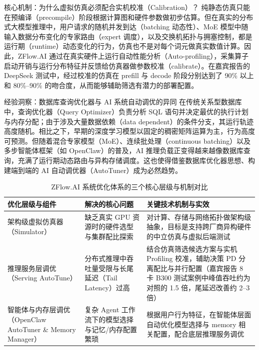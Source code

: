 \documentclass[UTF8,a4paper,11pt,fontset=fandol]{ctexart}
\begin{document}
\begin{importantbox}{核心机制：为什么虚拟仿真必须配合实机校准（Calibration）？}
纯静态仿真只能在预编译（precompile）阶段根据计算图和硬件参数做初步估算。但在真实的分布式大模型推理中，用户请求的随机并发到达（batching 动态性）、MoE 模型中随输入数据分布变化的专家路由（expert 调度），以及交换机拓扑与拥塞控制，都是运行期（runtime）动态变化的行为，仿真也不是对每个词元做真实数值计算。因此，ZFlow.AI 通过在真实硬件上运行自动性能分析（Auto-profiling），采集算子启动开销与运行分布特征并反馈给仿真器做参数校准（calibrate）。在嘉宾报告的 DeepSeek 测试中，经过校准的仿真在 prefill 与 decode 阶段分别达到了 90\% 以上和 80\%–90\% 的吻合度，从而能够辅助筛选有潜力的部署配置。
\end{importantbox}
\begin{knowledgebox}{经验洞察：数据库查询优化器与 AI 系统自动调优的异同}
在传统关系型数据库中，查询优化器（Query Optimizer）负责分析 SQL 语句并决定最优的执行计划与内存分配；由于涉及大量数据依赖（data dependent）的条件分支，其运行轨迹高度随机。相比之下，早期的深度学习模型以固定的稠密矩阵运算为主，行为高度可预测。但随着混合专家模型（MoE）、连续批处理（continuous batching）以及多步智能体框架（如 OpenClaw）的普及，AI 推理负载正变得越来越像数据库查询，充满了运行期动态路由与异构存储调度。这也使得借鉴数据库优化器思想、构建端到端的 AI 自动调优器（AutoTuner）成为必然趋势。
\end{knowledgebox}
\begin{table}[H]\centering\small
\caption{ZFlow.AI 系统优化体系的三个核心层级与机制对比}
\begin{tabular}{>{\raggedright\arraybackslash}p{\dimexpr(\linewidth-6\tabcolsep)/3\relax}>{\raggedright\arraybackslash}p{\dimexpr(\linewidth-6\tabcolsep)/3\relax}>{\raggedright\arraybackslash}p{\dimexpr(\linewidth-6\tabcolsep)/3\relax}}
\toprule
优化层级与组件 & 解决的核心问题 & 关键技术机制与实效\\\midrule
架构级虚拟仿真器（Simulator） & 缺乏真实 GPU 资源时的硬件选型与集群配比探索 & 对计算、存储与网络拓扑做架构级抽象，目标是支持跨厂商异构硬件的中立仿真与虚拟后端测试\\[4pt]
推理服务层调优（Serving AutoTune） & 分布式推理中吞吐量受限与长尾延迟（Tail Latency）过高 & 结合仿真筛选候选方案与实机 Profiling 校准，辅助决策 PD 分离配比与并行配置（嘉宾报告 8 卡 B300 测试案例中峰值吞吐约为对照的 1.5 倍，尾延迟改善约 2–3 倍）\\[4pt]
智能体与内存层调优（OpenClaw AutoTuner \& Memory Manager） & 复杂 Agent 工作流下的模型选择与记忆/内存配置繁琐 & 根据用户行为特征，在智能体层面自动优化模型选择与 memory 相关配置，配合底层推理服务调优\\[4pt]
\bottomrule\end{tabular}\end{table}
\end{document}
